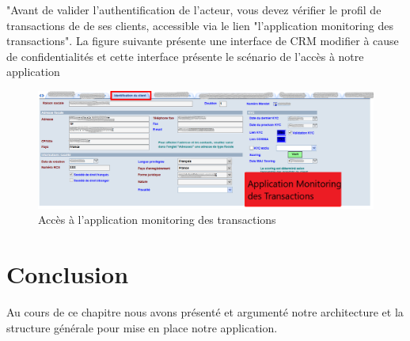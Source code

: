 "Avant de valider l'authentification de l'acteur, vous devez vérifier le profil de transactions de de ses clients, accessible via le lien "l'application monitoring des transactions".
\newline
La figure suivante présente une interface de CRM modifier à cause de confidentialités et cette interface présente le scénario de l'accès à notre application
\newpage
\begin{figure}[!ht]\centering
\includegraphics[width=1\textwidth]{chapitres/chapitre8/figures/acces.png}
\caption{Accès à l'application monitoring des transactions}
\label{fig:acces}
\end{figure}
\section*{Conclusion}
Au cours de ce chapitre nous avons présenté et argument\'e notre architecture et la structure générale pour mise en place notre application.